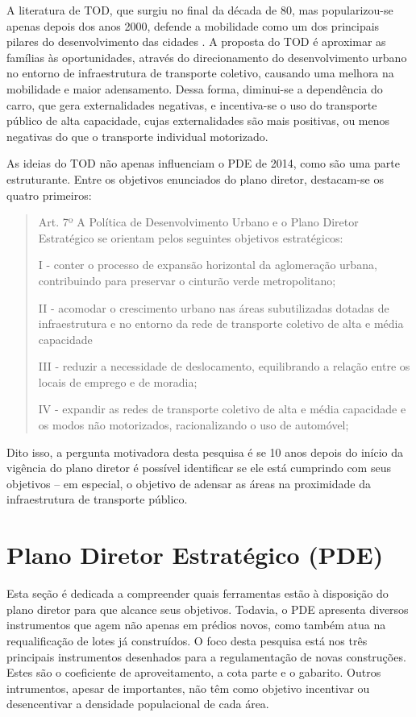 A literatura de TOD, que surgiu no final da década de 80, mas popularizou-se apenas depois dos anos 2000, defende a mobilidade como um dos principais pilares do desenvolvimento das cidades \cite{Ibraeva2020}. A proposta do TOD é aproximar as famílias às oportunidades, através do direcionamento do desenvolvimento urbano no entorno de infraestrutura de transporte coletivo, causando uma melhora na mobilidade e maior adensamento. Dessa forma, diminui-se a dependência do carro, que gera externalidades negativas, e incentiva-se o uso do transporte público de alta capacidade, cujas externalidades são mais positivas, ou menos negativas do que o transporte individual motorizado.

As ideias do TOD não apenas influenciam o PDE de 2014, como são uma parte estruturante. Entre os objetivos enunciados do plano diretor, destacam-se os quatro primeiros:

{\small
\begin{quote}
    Art. 7º A Política de Desenvolvimento Urbano 
    e o Plano Diretor Estratégico se orientam pelos 
    seguintes objetivos estratégicos:

    I - conter o processo de expansão horizontal da aglomeração urbana, contribuindo para preservar o cinturão verde metropolitano;

    II - acomodar o crescimento urbano nas áreas subutilizadas dotadas de infraestrutura e no entorno da rede de transporte coletivo de alta e média capacidade

    III - reduzir a necessidade de deslocamento, equilibrando a relação entre os locais de emprego e de moradia;

    IV - expandir as redes de transporte coletivo de alta e média capacidade e os modos não motorizados, racionalizando o uso de automóvel;
\end{quote}
}
Dito isso, a pergunta motivadora desta pesquisa é se 10 anos depois do início da vigência do plano diretor é possível identificar se ele está cumprindo com seus objetivos -- em especial, o objetivo de adensar as áreas na proximidade da infraestrutura de transporte público.

\section{Plano Diretor Estratégico (PDE)}
\label{sec:plano-diretor}

Esta seção é dedicada a compreender quais ferramentas estão à disposição do plano diretor para que alcance seus objetivos. Todavia, o PDE apresenta diversos instrumentos que agem não apenas em prédios novos, como também atua na requalificação de lotes já construídos. O foco desta pesquisa está nos três principais instrumentos desenhados para a regulamentação de novas construções. Estes são o coeficiente de aproveitamento, a cota parte e o gabarito. Outros intrumentos, apesar de importantes, não têm como objetivo incentivar ou desencentivar a densidade populacional de cada área. 

